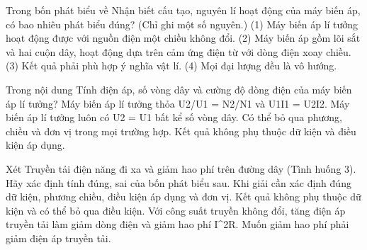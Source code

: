 \begin{ex}
Trong bốn phát biểu về Nhận biết cấu tạo, nguyên lí hoạt động của máy biến áp, có bao nhiêu phát biểu đúng? (Chỉ ghi một số nguyên.) (1) Máy biến áp lí tưởng hoạt động được với nguồn điện một chiều không đổi. (2) Máy biến áp gồm lõi sắt và hai cuộn dây, hoạt động dựa trên cảm ứng điện từ với dòng điện xoay chiều. (3) Kết quả phải phù hợp ý nghĩa vật lí. (4) Mọi đại lượng đều là vô hướng.
\end{ex}

\begin{ex}
Trong nội dung Tính điện áp, số vòng dây và cường độ dòng điện của máy biến áp lí tưởng?
\choice
{\True Máy biến áp lí tưởng thỏa U2/U1 = N2/N1 và U1I1 = U2I2.}
{Máy biến áp lí tưởng luôn có U2 = U1 bất kể số vòng dây.}
{Có thể bỏ qua phương, chiều và đơn vị trong mọi trường hợp.}
{Kết quả không phụ thuộc dữ kiện và điều kiện áp dụng.}
\end{ex}

\begin{ex}
Xét Truyền tải điện năng đi xa và giảm hao phí trên đường dây (Tình huống 3). Hãy xác định tính đúng, sai của bốn phát biểu sau.
\choiceTF
{\True Khi giải cần xác định đúng dữ kiện, phương chiều, điều kiện áp dụng và đơn vị.}
{Kết quả không phụ thuộc dữ kiện và có thể bỏ qua điều kiện.}
{\True Với công suất truyền không đổi, tăng điện áp truyền tải làm giảm dòng điện và giảm hao phí I^2R.}
{Muốn giảm hao phí phải giảm điện áp truyền tải.}
\end{ex}

